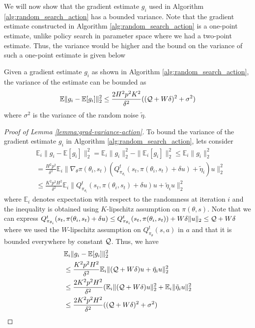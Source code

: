 We will now show that the gradient estimate $g_i$ used in Algorithm
\ref{alg:random_search_action} has a bounded variance. Note that the
gradient estimate constructed in Algorithm
\ref{alg:random_search_action} is a one-point estimate, unlike policy
search in parameter space where we had a two-point estimate. Thus, the variance would be higher and the bound
on the variance of such a one-point estimate is given below
\begin{lemma}
  \label{lemma:grad-variance-action}
  Given a gradient estimate $g_i$ as shown in Algorithm
  \ref{alg:random_search_action}, the variance of the estimate can be
  bounded as
  \begin{equation}
    \label{eq:grad-variance-action}
    \mathbb{E}\|g_i - \mathbb{E}[g_i]\|_2^2 \leq
    \frac{2H^2p^2K^2}{\delta^2} ((\mathcal{Q} + W\delta)^2 + \sigma^2)
  \end{equation}
  where $\sigma^2$ is the variance of the random noise $\tilde{\eta}$.
\end{lemma}



\begin{proof}[Proof of Lemma \ref{lemma:grad-variance-action}]
  To bound the variance of the gradient estimate $g_i$ in Algorithm
  \ref{alg:random_search_action}, lets consider
  \begin{align*}
    &\mathbb{E}_i\|g_i - \mathbb{E}[g_i]\|_2^2 = \mathbb{E}_i\|g_i\|_2^2 -
                                              \|\mathbb{E}_i[g_i]\|_2^2
                                            \leq \mathbb{E}_i\|g_i\|_2^2 \\
    &= \frac{H^2p^2}{\delta^2} \mathbb{E}_i\|\nabla_\theta
      \pi(\theta_i, s_t)
    (Q_{\pi_{\theta_i}}^t(s_t, \pi(\theta_i, s_t)
      + \delta u) + \tilde{\eta}_i) u\|_2^2 \\
    &\leq \frac{K^2p^2H^2}{\delta^2} \mathbb{E}_{i}\|Q_{\pi_{\theta_i}}^t(s_t, \pi(\theta_i,
      s_t) + \delta u)u + \tilde{\eta}_iu\|_2^2
  \end{align*}
  where $\mathbb{E}_i$ denotes expectation with respect to the
  randomness at iteration $i$ and the inequality is obtained using
  $K$-lipschitz assumption on $\pi(\theta, s)$. Note that we can
  express $Q_{\pi_{\theta_i}}^t(s_t, \pi(\theta_i, s_t) + \delta u)
  \leq Q_{\pi_{\theta_i}}^t(s_t, \pi(\theta_i, s_t)) + W\delta\|u\|_2
  \leq \mathcal{Q} + W\delta$ where we used the $W$-lipschitz assumption on
  $Q_{\pi_{\theta}}^t(s, a)$ in $a$ and that it is bounded everywhere
  by constant $\mathcal{Q}$. Thus, we have
  \begin{align*}
    &\mathbb{E}_i\|g_i - \mathbb{E}[g_i]\|_2^2 \\
    &\leq \frac{K^2p^2H^2}{\delta^2} \mathbb{E}_{i}\|(\mathcal{Q} + W\delta)u +
      \tilde{\eta}_iu\|_2^2 \\
    &\leq \frac{2K^2p^2H^2}{\delta^2}
      (\mathbb{E}_i\|(\mathcal{Q}+W\delta)u\|_2^2 +
      \mathbb{E}_i\|\tilde{\eta}_iu\|_2^2 \\
    &\leq \frac{2K^2p^2H^2}{\delta^2} ((\mathcal{Q}+W\delta)^2 + \sigma^2)
  \end{align*}
\end{proof}

